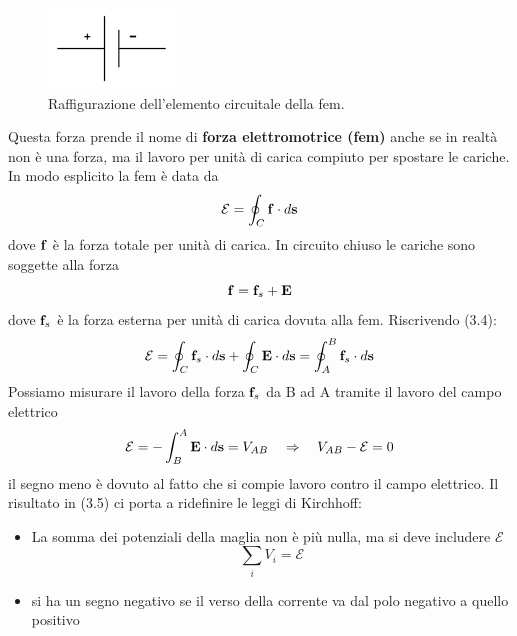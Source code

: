  \begin{figure}
  \centering
  \includegraphics[width=0.3\textwidth]{images/fem}
  \caption{Raffigurazione dell'elemento circuitale della fem.}
\end{figure}
 Questa forza prende il nome di \textbf{forza elettromotrice (fem)} anche se in realt\`a non \`e una forza, ma il lavoro per unit\`a di carica compiuto per spostare le cariche. 
 In modo esplicito la fem \`e data da 
 \begin{equation}
 	\mathcal{E} = \oint_{C} \bold{f} \cdot d\bold{s} 
 \end{equation}
 dove $\bold{f}$ \`e la forza totale  per unit\`a di carica. In circuito chiuso le cariche sono soggette alla forza 
 \begin{equation*}
 	\bold{f} = \bold{f}_{s} + \bold{E}
 \end{equation*}
dove $\bold{f}_{s}$ \`e la forza esterna per unit\`a di carica dovuta alla fem. Riscrivendo (3.4):
\begin{equation*}
	\mathcal{E} = \oint_{C} \bold{f}_{s} \cdot d\bold{s} + \oint_{C} \bold{E} \cdot d \bold{s} = \oint_{A}^{B} \bold{f}_{s} \cdot d\bold{s}
\end{equation*}   
Possiamo misurare il lavoro della forza $\bold{f}_{s}$ da B ad A tramite il lavoro del campo elettrico
\begin{equation}
	\mathcal{E} = - \int_{B}^{A} \bold{E} \cdot d \bold{s} = V_{AB}  \quad \Rightarrow \quad V_{AB} - \mathcal{E} = 0
\end{equation}
il segno meno \`e dovuto al fatto che si compie lavoro contro il campo elettrico. Il risultato in (3.5) ci porta a ridefinire le leggi di Kirchhoff:
\begin{itemize}
	\item La somma dei potenziali della maglia non \`e pi\`u nulla, ma si deve includere $\mathcal{E}$
	\begin{equation*}
		\sum_{i} V_i = \mathcal{E}
	\end{equation*}
	\item si ha un segno negativo se  il verso della corrente va dal polo negativo a quello positivo
\end{itemize}

